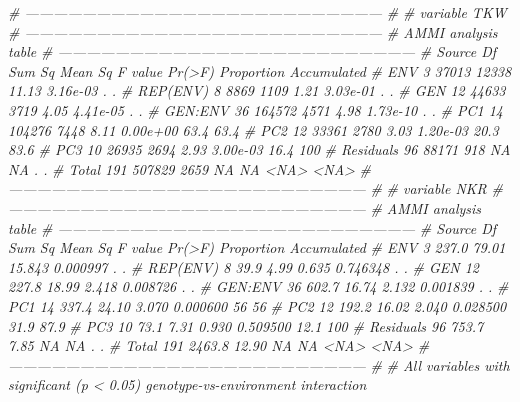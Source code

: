\documentclass[
]{book}
\newenvironment{Shaded}{\begin{snugshade}}{\end{snugshade}}
\newcommand{\CommentTok}[1]{\textcolor[rgb]{0.56,0.35,0.01}{\textit{#1}}}
\begin{document}
\begin{Shaded}
\begin{Highlighting}[]
{\CommentTok{# ---------------------------------------------------------------------------}
\CommentTok{# }
\CommentTok{# variable TKW }
\CommentTok{# ---------------------------------------------------------------------------}
\CommentTok{# AMMI analysis table}
\CommentTok{# ---------------------------------------------------------------------------}
\CommentTok{#     Source  Df Sum Sq Mean Sq F value   Pr(>F) Proportion Accumulated}
\CommentTok{#        ENV   3  37013   12338   11.13 3.16e-03          .           .}
\CommentTok{#   REP(ENV)   8   8869    1109    1.21 3.03e-01          .           .}
\CommentTok{#        GEN  12  44633    3719    4.05 4.41e-05          .           .}
\CommentTok{#    GEN:ENV  36 164572    4571    4.98 1.73e-10          .           .}
\CommentTok{#        PC1  14 104276    7448    8.11 0.00e+00       63.4        63.4}
\CommentTok{#        PC2  12  33361    2780    3.03 1.20e-03       20.3        83.6}
\CommentTok{#        PC3  10  26935    2694    2.93 3.00e-03       16.4         100}
\CommentTok{#  Residuals  96  88171     918      NA       NA          .           .}
\CommentTok{#      Total 191 507829    2659      NA       NA       <NA>        <NA>}
\CommentTok{# ---------------------------------------------------------------------------}
\CommentTok{# }
\CommentTok{# variable NKR }
\CommentTok{# ---------------------------------------------------------------------------}
\CommentTok{# AMMI analysis table}
\CommentTok{# ---------------------------------------------------------------------------}
\CommentTok{#     Source  Df Sum Sq Mean Sq F value   Pr(>F) Proportion Accumulated}
\CommentTok{#        ENV   3  237.0   79.01  15.843 0.000997          .           .}
\CommentTok{#   REP(ENV)   8   39.9    4.99   0.635 0.746348          .           .}
\CommentTok{#        GEN  12  227.8   18.99   2.418 0.008726          .           .}
\CommentTok{#    GEN:ENV  36  602.7   16.74   2.132 0.001839          .           .}
\CommentTok{#        PC1  14  337.4   24.10   3.070 0.000600         56          56}
\CommentTok{#        PC2  12  192.2   16.02   2.040 0.028500       31.9        87.9}
\CommentTok{#        PC3  10   73.1    7.31   0.930 0.509500       12.1         100}
\CommentTok{#  Residuals  96  753.7    7.85      NA       NA          .           .}
\CommentTok{#      Total 191 2463.8   12.90      NA       NA       <NA>        <NA>}
\CommentTok{# ---------------------------------------------------------------------------}
\CommentTok{# }
\CommentTok{# All variables with significant (p < 0.05) genotype-vs-environment interaction}
}
\end{Highlighting}
\end{Shaded}
\end{document}
